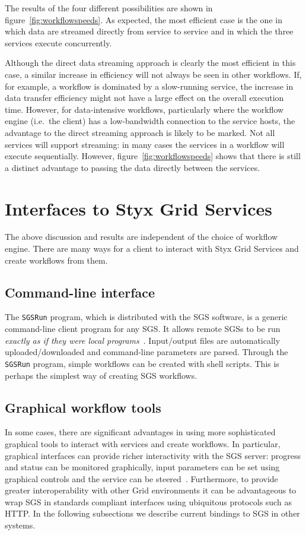 \documentclass[a4paper]{article}
\begin{document}
The results of the four different possibilities are shown in figure~\ref{fig:workflowspeeds}.  As expected, the most efficient case is the one in which data are streamed directly from service to service and in which the three services execute concurrently.

Although the direct data streaming approach is clearly the most efficient in this case, a similar increase in efficiency will not always be seen in other workflows.  If, for example, a workflow is dominated by a slow-running service, the increase in data transfer efficiency might not have a large effect on the overall execution time.  However, for data-intensive workflows, particularly where the workflow engine (i.e.\ the client) has a low-bandwidth connection to the service hosts, the advantage to the direct streaming approach is likely to be marked.  Not all services will support streaming: in many cases the services in a workflow will execute sequentially.  However, figure~\ref{fig:workflowspeeds} shows that there is still a distinct advantage to passing the data directly between the services.


\section{Interfaces to Styx Grid Services}\label{sec:interfaces}

The above discussion and results are independent of the choice of workflow engine.  There are many ways for a client to interact with Styx Grid Services and create workflows from them.

\subsection{Command-line interface}\label{sec:sgsrun}
The \texttt{SGSRun} program, which is distributed with the SGS software, is a generic command-line client program for any SGS.  It allows remote SGSs to be run \textit{exactly as if they were local programs}~\cite{blower_lncs:2006, blower_escience:2006}.  Input/output files are automatically uploaded/downloaded and command-line parameters are parsed.  Through the \texttt{SGSRun} program, simple workflows can be created with shell scripts.  This is perhaps the simplest way of creating SGS workflows.

\subsection{Graphical workflow tools}\label{subsec:graphical-workflow}
In some cases, there are significant advantages in using more sophisticated graphical tools to interact with services and create workflows.  In particular, graphical interfaces can provide richer interactivity with the SGS server: progress and status can be monitored graphically, input parameters can be set using graphical controls and the service can be steered~\cite{blower:2005}. Furthermore, to provide greater interoperability with other Grid environments it can be advantageous to wrap SGS in standards compliant interfaces using ubiquitous protocols such as HTTP. In the following subsections we describe current bindings to SGS in other systems.
\end{document}
